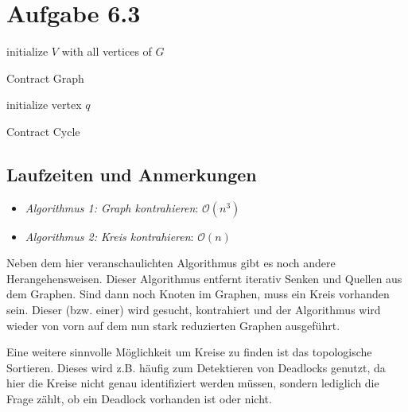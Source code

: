 \documentclass{article}
\begin{document}
\section*{Aufgabe 6.3}
\begin{algorithm}[H]
  initialize $V$ with all vertices of $G$\;
  \caption{Contract Graph}
\end{algorithm}

\begin{algorithm}[H]
  initialize vertex $q$\;
  \caption{Contract Cycle}
\end{algorithm}

\subsection*{Laufzeiten und Anmerkungen}

\begin{itemize}
	\item \textit{Algorithmus 1: Graph kontrahieren}: $\mathcal{O}(n^3)$
  \item \textit{Algorithmus 2: Kreis kontrahieren}: $\mathcal{O}(n)$
\end{itemize}

Neben dem hier veranschaulichten Algorithmus gibt es noch andere Herangehensweisen. Dieser Algorithmus entfernt iterativ Senken und Quellen aus dem Graphen. Sind dann noch Knoten im Graphen, muss ein Kreis vorhanden sein. Dieser (bzw. einer) wird gesucht, kontrahiert und der Algorithmus wird wieder von vorn auf dem nun stark reduzierten Graphen ausgeführt. 

Eine weitere sinnvolle Möglichkeit um Kreise zu finden ist das topologische Sortieren. Dieses wird z.B. häufig zum Detektieren von Deadlocks genutzt, da hier die Kreise nicht genau identifiziert werden müssen, sondern lediglich die Frage zählt, ob ein Deadlock vorhanden ist oder nicht.
\end{document}
